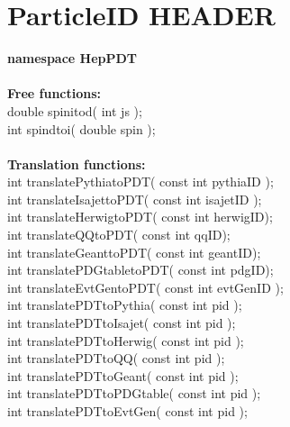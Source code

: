 \documentclass[twoside,12pt]{article}
\begin{document}
\section { ParticleID HEADER}
\label{PIDclass}

\begin{tabbing}

{\bf namespace HepPDT} \\  \\

{\bf Free functions:} \\
\hspace{0.5in}  double spinitod( int js ); \\
\hspace{0.5in}  int spindtoi( double spin ); \\  \\

{\bf Translation functions:} \\
\hspace{0.5in} int translatePythiatoPDT( const int pythiaID ); \\
\hspace{0.5in} int translateIsajettoPDT( const int isajetID ); \\
\hspace{0.5in} int translateHerwigtoPDT( const int herwigID); \\
\hspace{0.5in} int translateQQtoPDT( const int qqID); \\
\hspace{0.5in} int translateGeanttoPDT( const int geantID); \\
\hspace{0.5in} int translatePDGtabletoPDT( const int pdgID); \\
\hspace{0.5in} int translateEvtGentoPDT( const int evtGenID ); \\

\hspace{0.5in} int translatePDTtoPythia( const int pid ); \\
\hspace{0.5in} int translatePDTtoIsajet( const int pid ); \\
\hspace{0.5in} int translatePDTtoHerwig( const int pid ); \\
\hspace{0.5in} int translatePDTtoQQ( const int pid ); \\
\hspace{0.5in} int translatePDTtoGeant( const int pid ); \\
\hspace{0.5in} int translatePDTtoPDGtable( const int pid ); \\
\hspace{0.5in} int translatePDTtoEvtGen( const int pid ); \\  \\


\end{tabbing}
\end{document}
